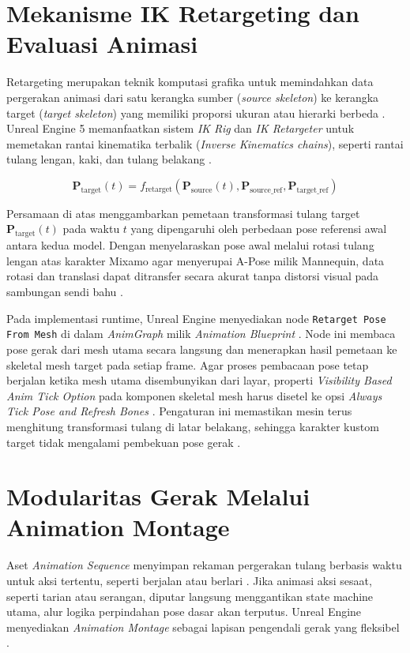 \documentclass[a4paper,oneside,12pt]{report}
\begin{document}
\section{Mekanisme IK Retargeting dan Evaluasi Animasi}
Retargeting merupakan teknik komputasi grafika untuk memindahkan data pergerakan animasi dari satu kerangka sumber (\textit{source skeleton}) ke kerangka target (\textit{target skeleton}) yang memiliki proporsi ukuran atau hierarki berbeda \cite{epic-retargeter}. Unreal Engine 5 memanfaatkan sistem \textit{IK Rig} dan \textit{IK Retargeter} untuk memetakan rantai kinematika terbalik (\textit{Inverse Kinematics chains}), seperti rantai tulang lengan, kaki, dan tulang belakang \cite{epic-retargeter}.

\begin{equation}
	\mathbf{P}_{\text{target}}(t) = f_{\text{retarget}}(\mathbf{P}_{\text{source}}(t), \mathbf{P}_{\text{source\_ref}}, \mathbf{P}_{\text{target\_ref}})
\end{equation}

Persamaan di atas menggambarkan pemetaan transformasi tulang target $\mathbf{P}_{\text{target}}(t)$ pada waktu $t$ yang dipengaruhi oleh perbedaan pose referensi awal antara kedua model. Dengan menyelaraskan pose awal melalui rotasi tulang lengan atas karakter Mixamo agar menyerupai A-Pose milik Mannequin, data rotasi dan translasi dapat ditransfer secara akurat tanpa distorsi visual pada sambungan sendi bahu \cite{epic-retargeter}.

Pada implementasi runtime, Unreal Engine menyediakan node \texttt{Retarget Pose From Mesh} di dalam \textit{AnimGraph} milik \textit{Animation Blueprint} \cite{modul6}. Node ini membaca pose gerak dari mesh utama secara langsung dan menerapkan hasil pemetaan ke skeletal mesh target pada setiap frame. Agar proses pembacaan pose tetap berjalan ketika mesh utama disembunyikan dari layar, properti \textit{Visibility Based Anim Tick Option} pada komponen skeletal mesh harus disetel ke opsi \textit{Always Tick Pose and Refresh Bones} \cite{modul6}. Pengaturan ini memastikan mesin terus menghitung transformasi tulang di latar belakang, sehingga karakter kustom target tidak mengalami pembekuan pose gerak \cite{modul6}.

\section{Modularitas Gerak Melalui Animation Montage}
Aset \textit{Animation Sequence} menyimpan rekaman pergerakan tulang berbasis waktu untuk aksi tertentu, seperti berjalan atau berlari \cite{epic-skeletal}. Jika animasi aksi sesaat, seperti tarian atau serangan, diputar langsung menggantikan state machine utama, alur logika perpindahan pose dasar akan terputus. Unreal Engine menyediakan \textit{Animation Montage} sebagai lapisan pengendali gerak yang fleksibel \cite{epic-montage}.
\end{document}
